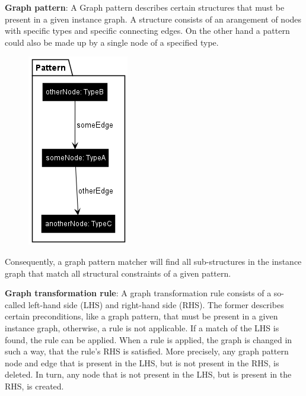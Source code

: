 \textbf{Graph pattern}:\newline
A Graph pattern describes certain structures that must be present in a given instance graph. A structure consists of an arangement of nodes with specific types and specific connecting edges. On the other hand a pattern could also be made up by a single node of a specified type.\newline
\begin{figure}[h]
    \centering
    \includegraphics[scale=0.7]{pictures/pattern.png}
    \caption{}
    \label{pattern example}
\end{figure}

Consequently, a graph pattern matcher will find all sub-structures in the instance graph that match all structural constraints of a given pattern.\newline
\clearpage

\textbf{Graph transformation rule}:\newline\newline
A graph transformation rule consists of a so-called left-hand side (LHS) and right-hand side (RHS). The former describes certain preconditions, like a graph pattern, that must be present in a given instance graph, otherwise, a rule is not applicable. If a match of the LHS is found, the rule can be applied. When a rule is applied, the graph is changed in such a way, that the rule's RHS is satisfied. More precisely, any graph pattern node and edge that is present in the LHS, but is not present in the RHS, is deleted. In turn, any node that is not present in the LHS, but is present in the RHS, is created.\newline

